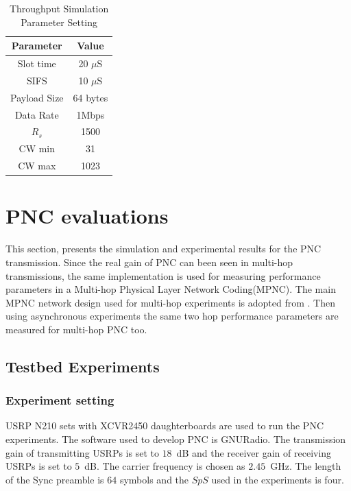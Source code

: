 \begin{table}[!t]
\caption{Throughput Simulation Parameter Setting}
\label{table:throughput}
\centering
\begin{tabular}{|c||c|}
\hline
Parameter & Value \\  
\hline
 Slot time & 20 $\mu$S \\ 
 \hline
 SIFS & 10 $\mu$S \\
 \hline
 Payload Size & 64 bytes\\ 
\hline
Data Rate & 1Mbps \\
\hline
$R_s$ & 1500 \\
\hline 
CW min & 31 \\
\hline
CW max & 1023 \\
\hline 
\end{tabular}
\end{table}







\section{PNC evaluations}
This section, presents the simulation and experimental results for the PNC transmission. Since the real gain of PNC can been seen in multi-hop transmissions, the same implementation is used for measuring performance parameters in a Multi-hop Physical Layer Network Coding(MPNC). The main MPNC network design used for multi-hop experiments is adopted from \cite{zhang2017cross}. Then using asynchronous experiments the same two hop performance parameters are measured for multi-hop PNC too. 

\subsection{Testbed Experiments}

\subsubsection{Experiment setting}
USRP N210 sets with XCVR2450 daughterboards are used to run the PNC experiments. The software used to develop PNC is GNURadio. The transmission gain of transmitting USRPs is set to $18$~dB and the receiver gain of receiving USRPs is set  to $5$~dB. %
The carrier frequency is chosen as $2.45$~GHz. The length of the Sync preamble is $64$ symbols and the $SpS$ used in the experiments is four. 

